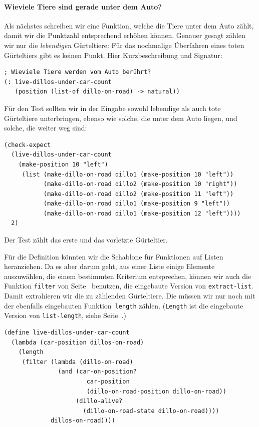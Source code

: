 \paragraph{Wieviele Tiere sind gerade unter dem Auto?} Als nächstes
schreiben wir eine Funktion, welche die Tiere unter dem Auto zählt,
damit wir die Punktzahl entsprechend erhöhen können.  Genauer gesagt
zählen wir nur die \emph{lebendigen} Gürteltiere: Für das nochmalige
Überfahren eines toten Gürteltiers gibt es keinen Punkt.  Hier
Kurzbeschreibung und Signatur:
%
\begin{lstlisting}
; Wieviele Tiere werden vom Auto berührt?
(: live-dillos-under-car-count 
   (position (list-of dillo-on-road) -> natural))
\end{lstlisting}
%
Für den Test sollten wir in der Eingabe sowohl lebendige als auch
tote Gürteltiere unterbringen, ebenso wie solche, die unter dem Auto
liegen, und solche, die weiter weg sind:
%
\begin{lstlisting}
(check-expect
  (live-dillos-under-car-count
    (make-position 10 "left")
     (list (make-dillo-on-road dillo1 (make-position 10 "left"))
           (make-dillo-on-road dillo2 (make-position 10 "right"))
           (make-dillo-on-road dillo2 (make-position 11 "left"))
           (make-dillo-on-road dillo1 (make-position 9 "left"))
           (make-dillo-on-road dillo1 (make-position 12 "left"))))
  2)
\end{lstlisting}
%
Der Test zählt das erste und das vorletzte Gürteltier.

Für die Definition könnten wir die Schablone für Funktionen auf Listen
heranziehen.  Da es aber darum geht, aus einer Liste einige Elemente
auszuwählen, die einem bestimmten Kriterium entsprechen, können wir
auch die Funktion \lstinline{filter} von Seite~\pageref{func:filter}
benutzen, die eingebaute Version von \lstinline{extract-list}.  Damit
extrahieren wir die zu zählenden Gürteltiere.  Die müssen wir nur noch
mit der ebenfalls eingebauten Funktion~\lstinline{length}
zählen. (\lstinline{Length} ist die eingebaute Version von
\lstinline{list-length}, siehe Seite~\pageref{func:length}.)
%
\begin{lstlisting}
(define live-dillos-under-car-count
  (lambda (car-position dillos-on-road)
    (length
     (filter (lambda (dillo-on-road)
               (and (car-on-position?
                       car-position
                       (dillo-on-road-position dillo-on-road))
                    (dillo-alive? 
                      (dillo-on-road-state dillo-on-road))))
             dillos-on-road))))
\end{lstlisting}

